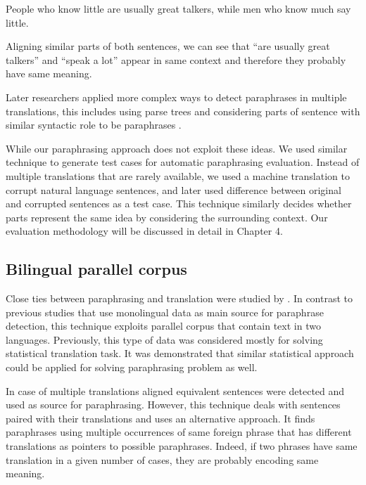 \begin{center}
\begin{Large}
People who know little are usually great talkers, while men who know much say little.
\end{Large}
\end{center}

Aligning similar parts of both sentences, we can see that ``are usually great talkers'' and ``speak a lot'' appear in same context and therefore they probably have same meaning.

Later researchers applied more complex ways to detect paraphrases in multiple translations, this includes using parse trees and considering parts of sentence with similar syntactic role to be paraphrases \cite{pang2003syntax}.

While our paraphrasing approach does not exploit these ideas. We used similar technique to generate test cases for automatic paraphrasing evaluation. Instead of multiple translations that are rarely available, we used a machine translation to corrupt natural language sentences, and later used difference between original and corrupted sentences as a test case. This technique similarly decides whether parts represent the same idea by considering the surrounding context. Our evaluation methodology will be discussed in detail in Chapter 4.

\subsection{Bilingual parallel corpus}

Close ties between paraphrasing and translation were studied by \cite{Callison-Burch2007}. In contrast to previous studies that use monolingual data as main source for paraphrase detection, this technique exploits parallel corpus that contain text in two languages. Previously, this type of data was considered mostly for solving statistical translation task. It was demonstrated that similar statistical approach could be applied for solving paraphrasing problem as well.

In case of multiple translations aligned equivalent sentences were detected and used as source for paraphrasing. However, this technique deals with sentences paired with their translations and uses an alternative approach. It finds paraphrases using multiple occurrences of same foreign phrase that has different translations as pointers to possible paraphrases. Indeed, if two phrases have same translation in a given number of cases, they are probably encoding same meaning.

